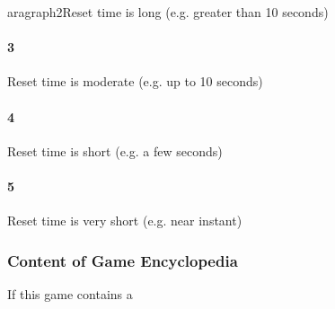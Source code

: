 aragraph{2}Reset time is long (e.g. greater than 10 seconds)\paragraph{3}Reset time is moderate (e.g. up to 10 seconds)\paragraph{4}Reset time is short (e.g. a few seconds)\paragraph{5}Reset time is very short (e.g. near instant)\subsubsection{Content of Game Encyclopedia}If this game contains a